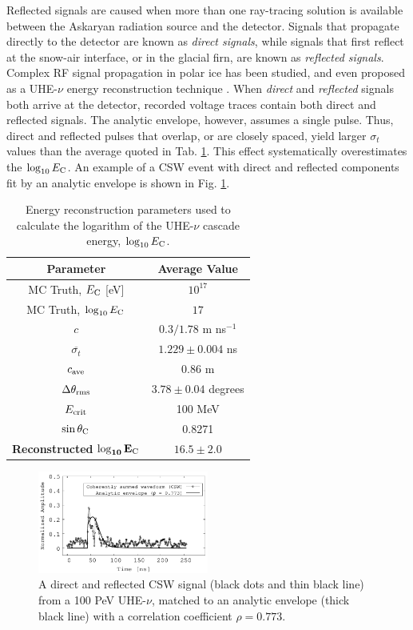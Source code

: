 \documentclass[amsmath,amssymb,aps,prd,10pt,twocolumn,showkeys]{revtex4}
\begin{document}
\begin{itemize}
Reflected signals are caused when more than one ray-tracing solution is available between the Askaryan radiation source and the detector.  Signals that propagate directly to the detector are known as \textit{direct signals}, while signals that first reflect at the snow-air interface, or in the glacial firn, are known as \textit{reflected signals}.  Complex RF signal propagation in polar ice has been studied, and even proposed as a UHE-$\nu$ energy reconstruction technique \cite{Barwick:2018497,anker2019neutrino-734}.  When \textit{direct} and \textit{reflected} signals both arrive at the detector, recorded voltage traces contain both direct and reflected signals.  The analytic envelope, however, assumes a single pulse.  Thus, direct and reflected pulses that overlap, or are closely spaced, yield larger $\sigma_t$ values than the average quoted in Tab. \ref{tab:2}.  This effect systematically overestimates the $\log_{10} E_{\rm C}$.  An example of a CSW event with direct and reflected components fit by an analytic envelope is shown in Fig. \ref{fig:example_waveforms_2}.

\begin{table}
\centering
\begin{tabular}{| c | c |}
\hline
\textbf{Parameter} & \textbf{Average Value} \\ \hline
MC Truth, $E_{\rm C}$ [eV] & $10^{17}$ \\
MC Truth, $\log_{10}E_{\rm C}$ & $17$ \\
$c$ & $0.3/1.78$ m ns$^{-1}$ \\
$\overline{\sigma_t}$ & $1.229 \pm 0.004$ ns \\
$c_{\rm ave}$ & 0.86 m \\
$\Delta\theta_{\rm rms}$ & $3.78\pm0.04$ degrees \\
$E_{\rm crit}$ & 100 MeV \\
$\sin\theta_{\rm C}$ & 0.8271 \\ \hline
\textbf{Reconstructed} $\mathbf{\log_{10}E_{\rm C}}$ & $16.5\pm 2.0$ \\
\hline
\end{tabular}
\caption{\label{tab:2} Energy reconstruction parameters used to calculate the logarithm of the UHE-$\nu$ cascade energy, $\log_{10}E_{\rm C}$.}
\end{table}

\begin{figure}
\centering
\includegraphics[width=0.5\textwidth]{Sept25_plot2.pdf}
\caption{\label{fig:example_waveforms_2} A direct and reflected CSW signal (black dots and thin black line) from a 100 PeV UHE-$\nu$, matched to an analytic envelope (thick black line) with a correlation coefficient $\rho = 0.773$.}
\end{figure}

\end{itemize}
\end{document}
